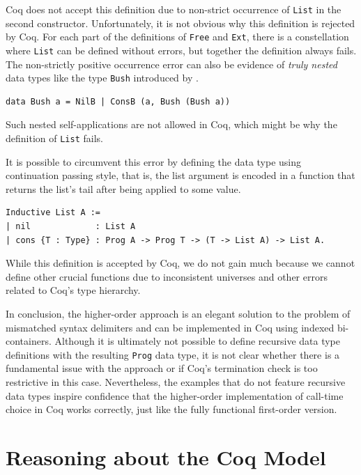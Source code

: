 \documentclass[a4paper, 11pt, fleqn, twoside, abstract=on]{scrreprt}
\newcommand{\hinl}[1]{\texttt{#1}}
\newcommand{\cinl}[1]{\texttt{#1}}
\begin{document}
Coq does not accept this definition due to non-strict occurrence of \cinl{List} in the second constructor.
Unfortunately, it is not obvious why this definition is rejected by Coq.
For each part of the definitions of \cinl{Free} and \cinl{Ext}, there is a constellation where \cinl{List} can be defined without errors, but together the definition always fails.
The non-strictly positive occurrence error can also be evidence of \textit{truly nested} data types like the type \hinl{Bush} introduced by \citet{bird1998nested}.

\begin{verbatim}
data Bush a = NilB | ConsB (a, Bush (Bush a))
\end{verbatim}

Such nested self-applications are not allowed in Coq, which might be why the definition of \cinl{List} fails.

It is possible to circumvent this error by defining the data type using continuation passing style, that is, the list argument is encoded in a function that returns the list's tail after being applied to some value.

\begin{verbatim}
Inductive List A :=
| nil             : List A
| cons {T : Type} : Prog A -> Prog T -> (T -> List A) -> List A.
\end{verbatim}

While this definition is accepted by Coq, we do not gain much because we cannot define other crucial functions due to inconsistent universes and other errors related to Coq's type hierarchy.

In conclusion, the higher-order approach is an elegant solution to the problem of mismatched syntax delimiters and can be implemented in Coq using indexed bi-containers.
Although it is ultimately not possible to define recursive data type definitions with the resulting \cinl{Prog} data type, it is not clear whether there is a fundamental issue with the approach or if Coq's termination check is too restrictive in this case.
Nevertheless, the examples that do not feature recursive data types inspire confidence that the higher-order implementation of call-time choice in Coq works correctly, just like the fully functional first-order version.

\chapter{Reasoning about the Coq Model}
\label{ch:progsInCoq}
\end{document}
